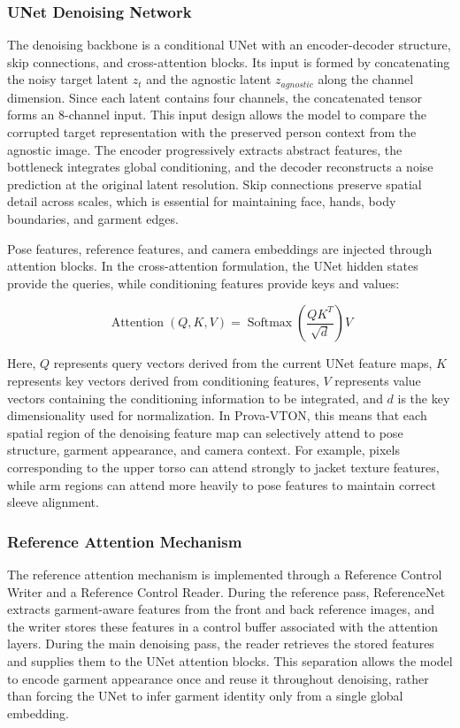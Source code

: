 \subsubsection*{UNet Denoising Network}
The denoising backbone is a conditional UNet with an encoder-decoder structure, skip connections, and cross-attention blocks. Its input is formed by concatenating the noisy target latent \(z_t\) and the agnostic latent \(z_{agnostic}\) along the channel dimension. Since each latent contains four channels, the concatenated tensor forms an 8-channel input. This input design allows the model to compare the corrupted target representation with the preserved person context from the agnostic image. The encoder progressively extracts abstract features, the bottleneck integrates global conditioning, and the decoder reconstructs a noise prediction at the original latent resolution. Skip connections preserve spatial detail across scales, which is essential for maintaining face, hands, body boundaries, and garment edges.

Pose features, reference features, and camera embeddings are injected through attention blocks. In the cross-attention formulation, the UNet hidden states provide the queries, while conditioning features provide keys and values:

\begin{equation}
\operatorname{Attention}(Q,K,V) = \operatorname{Softmax}\left(\frac{QK^T}{\sqrt{d}}\right)V
\end{equation}

Here, \(Q\) represents query vectors derived from the current UNet feature maps, \(K\) represents key vectors derived from conditioning features, \(V\) represents value vectors containing the conditioning information to be integrated, and \(d\) is the key dimensionality used for normalization. In Prova-VTON, this means that each spatial region of the denoising feature map can selectively attend to pose structure, garment appearance, and camera context. For example, pixels corresponding to the upper torso can attend strongly to jacket texture features, while arm regions can attend more heavily to pose features to maintain correct sleeve alignment.

\subsubsection*{Reference Attention Mechanism}
The reference attention mechanism is implemented through a Reference Control Writer and a Reference Control Reader. During the reference pass, ReferenceNet extracts garment-aware features from the front and back reference images, and the writer stores these features in a control buffer associated with the attention layers. During the main denoising pass, the reader retrieves the stored features and supplies them to the UNet attention blocks. This separation allows the model to encode garment appearance once and reuse it throughout denoising, rather than forcing the UNet to infer garment identity only from a single global embedding.

